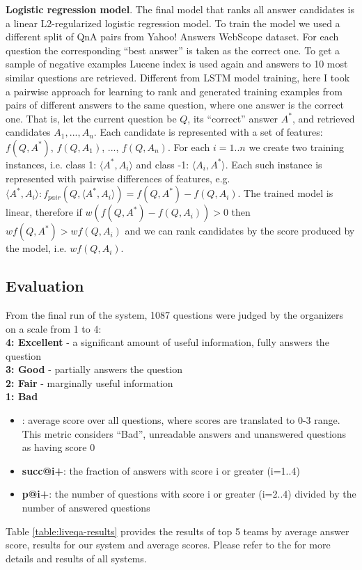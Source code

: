 \textbf{Logistic regression model}.
The final model that ranks all answer candidates is a linear L2-regularized logistic regression model.
To train the model we used a different split of QnA pairs from Yahoo! Answers WebScope dataset.
For each question the corresponding ``best answer'' is taken as the correct one.
To get a sample of negative examples Lucene index is used again and answers to 10 most similar questions are retrieved.
Different from LSTM model training, here I took a pairwise approach for learning to rank and generated training examples from pairs of different answers to the same question, where one answer is the correct one.
That is, let the current question be $Q$, its ``correct'' answer $A^*$, and retrieved candidates $A_1, ..., A_n$.
Each candidate is represented with a set of features: $f(Q, A^*)$, $f(Q, A_1)$, ..., $f(Q, A_n)$.
For each $i=1..n$ we create two training instances, i.e. class 1: $\langle A^*, A_i\rangle$ and class -1: $\langle A_i, A^*\rangle$.
Each such instance is represented with pairwise differences of features, e.g. $\langle A^*, A_i\rangle: f_{pair}(Q, \langle A^*, A_i\rangle) = f(Q, A^*) - f(Q, A_i)$.
The trained model is linear, therefore if $w(f(Q, A^*) - f(Q, A_i)) > 0$ then $w f(Q, A^*) > w f(Q, A_i)$ and we can rank candidates by the score produced by the model, i.e. $w f(Q, A_i)$.

\subsection{Evaluation}
\label{section:non-factoid:liveqa:evaluation}

From the final run of the system, 1087 questions were judged by the organizers on a scale from 1 to 4:\\
\textbf{4: Excellent} - a significant amount of useful information, fully answers the question\\
\textbf{3: Good} - partially answers the question\\
\textbf{2: Fair} - marginally useful information\\
\textbf{1: Bad} 




\begin{itemize}
\item : average score over all questions, where scores are translated to 0-3 range. This metric considers ``Bad'', unreadable answers and unanswered questions as having score 0
\item \textbf{succ@i+}: the fraction of answers with score i or greater (i=1..4)
\item \textbf{p@i+}: the number of questions with score i or greater (i=2..4) divided by the number of answered questions
\end{itemize}
Table \ref{table:liveqa-results} provides the results of top 5 teams by average answer score, results for our system and average scores.
Please refer to the \cite{overviewliveqa15} for more details and results of all systems.

